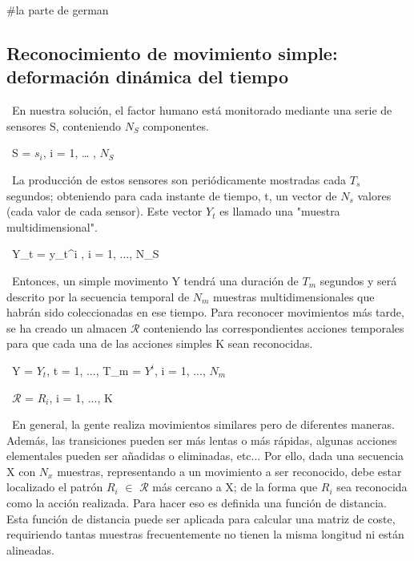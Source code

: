 #la parte de german

\subsection{Reconocimiento de movimiento simple: deformación dinámica del tiempo}



\ En nuestra solución, el factor humano está monitorado mediante una serie de sensores S, conteniendo $N_S$  componentes.

\ S = { $s_i$, i = 1, … , $N_S$ }

\ La producción de estos sensores son periódicamente mostradas cada $T_s$ segundos; obteniendo para cada instante de tiempo, t, un vector de $N_s$ valores (cada valor de cada sensor). Este vector $Y_t$ es llamado una "muestra multidimensional".

\ Y_t = {y_t^i , i = 1, ..., N_S}

\ Entonces, un simple movimento Y tendrá una duración de $T_m$ segundos y será descrito por la secuencia temporal de $N_m$ muestras multidimensionales que habrán sido coleccionadas en ese tiempo. Para reconocer movimientos más tarde, se ha creado un almacen $\mathcal{R}$ conteniendo las correspondientes acciones temporales para que cada una de las acciones simples K sean reconocidas.

\ Y = {$Y_t$, t = 1, ..., T_m} = {$Y^i$, i = 1, ..., $N_m$}

\ $\mathcal{R}$ = {$R_i$, i = 1, ..., K}

\ En general, la gente realiza movimientos similares pero de diferentes maneras. Además, las transiciones pueden ser más lentas o más rápidas, algunas acciones elementales pueden ser añadidas o eliminadas, etc... Por ello, dada una secuencia X con $N_x$ muestras, representando a un movimiento a ser reconocido, debe estar localizado el patrón $R_i$ $\in$ $\mathcal{R}$ más cercano a X; de la forma que $R_i$ sea reconocida como la acción realizada. Para hacer eso es definida una función de distancia. Esta función de distancia puede ser aplicada para calcular una matriz de coste, requiriendo tantas muestras frecuentemente no tienen la misma longitud ni están alineadas.

